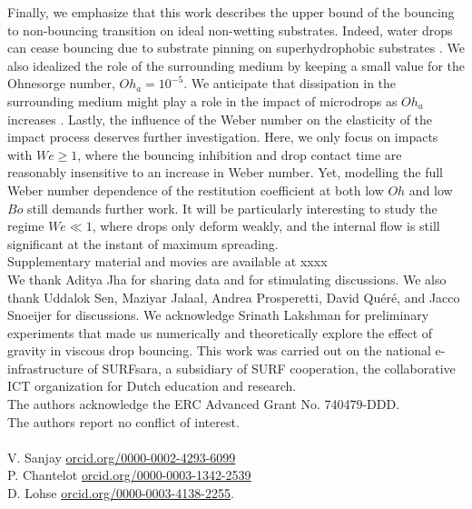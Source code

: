 \documentclass{jfm}
\newcommand{\Ohn}{\mathit{Oh}}
\newcommand{\Oha}{\mathit{Oh}_\mathit{a}}
\newcommand{\Wen}{\mathit{We}}
\newcommand{\Bon}{\mathit{Bo}}
\begin{document}
Finally, we emphasize that this work describes the upper bound of the bouncing to non-bouncing transition on ideal non-wetting substrates. Indeed, water drops can cease bouncing due to substrate pinning on superhydrophobic substrates \citep{sarma2022interfacial}. We also idealized the role of the surrounding medium by keeping a small value for the Ohnesorge number, $\Oha = 10^{-5}$. We anticipate that dissipation in the surrounding medium might play a role in the impact of microdrops as $\Oha$ increases \citep{kolinski2014drops, tai2021research}. Lastly, the influence of the Weber number on the elasticity of the impact process deserves further investigation. Here, we only focus on impacts with $\Wen \ge 1$, where the bouncing inhibition and drop contact time are reasonably insensitive to an increase in Weber number. Yet, modelling the full Weber number dependence of the restitution coefficient at both low $\Ohn$ and low $\Bon$ still demands further work. It will be particularly interesting to study the regime $\Wen \ll 1$, where drops only deform weakly, and the internal flow is still significant at the instant of maximum spreading.\\

 \label{SM} Supplementary material and movies are available at xxxx \\

 We thank Aditya Jha for sharing data and for stimulating discussions. We also thank Uddalok Sen, Maziyar Jalaal, Andrea Prosperetti, David Qu{\'e}r{\'e}, and Jacco Snoeijer for discussions. We acknowledge Srinath Lakshman for preliminary experiments that made us numerically and theoretically explore the effect of gravity in viscous drop bouncing. This work was carried out on the national e-infrastructure of SURFsara, a subsidiary of SURF cooperation, the collaborative ICT organization for Dutch education and research.\\

 The authors acknowledge the ERC Advanced Grant No. 740479-DDD.\\

 The  authors report no conflict of interest. \\

 \\
V. Sanjay \href{https://orcid.org/0000-0002-4293-6099}{orcid.org/0000-0002-4293-6099}\\
P. Chantelot \href{https://orcid.org/0000-0003-1342-2539}{orcid.org/0000-0003-1342-2539}\\
D. Lohse \href{https://orcid.org/0000-0003-4138-2255}{orcid.org/0000-0003-4138-2255}.\\
\end{document}
